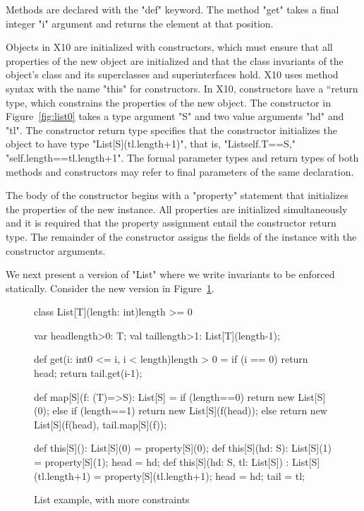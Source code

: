 \documentclass[preprint,nocopyrightspace,9pt]{sigplanconf}
\begin{document}
Methods are declared with the \xcd"def" keyword.
The method \xcd"get" takes a final integer \xcd"i" argument
and returns the element at that position.

Objects in X10 are initialized with constructors, which
must ensure that all properties of the new object
are initialized and that the class invariants of the object's
class and its superclasses and superinterfaces hold.
X10 uses method syntax with the name
\xcd"this" for constructors.
In X10, constructors have a ``return type, which constrains
the properties of the new object.  The constructor in
Figure~\ref{fig:list0} takes a type argument \xcd"S"
and two value arguments \xcd"hd" and \xcd"tl".  The constructor
return type specifies that the constructor initializes the
object to have type \xcd"List[S](tl.length+1)", that is,
\xcd"List{self.T==S," \xcd"self.length==tl.length+1}".
The formal parameter types and return types of both methods and
constructors may refer to final parameters of the same
declaration.

The body of the constructor
begins with a \xcd"property" statement that initializes the
properties of the new instance.  All properties are initialized
simultaneously and it is required that the property assignment
entail the constructor return type.
The remainder of the constructor assigns the fields of the
instance with the constructor arguments.

We next present a version of \xcd"List" where we write
invariants to be enforced statically.  Consider the new version
in Figure~\ref{fig:list}.

\begin{figure}
\begin{xtennoindent}
class List[T](length: int){length >= 0} {
  var head{length>0}: T;
  val tail{length>1}: List[T](length-1);

  def get(i: int{0 <= i, i < length}){length > 0} = {
    if (i == 0) return head;
    return tail.get(i-1);
  }

  def map[S](f: (T)=>S): List[S] = {
    if (length==0)
      return new List[S](0);
    else if (length==1)
      return new List[S](f(head));
    else
      return new List[S](f(head), tail.map[S](f));
  }

  def this[S](): List[S](0) = property[S](0);
  def this[S](hd: S): List[S](1) = {
    property[S](1); head = hd;
  }
  def this[S](hd: S, tl: List[S]) : List[S](tl.length+1) = {
    property[S](tl.length+1);
    head = hd; tail = tl;
  }
}
\end{xtennoindent}
\caption{List example, with more constraints}
\label{fig:list}
\end{figure}
\end{document}

